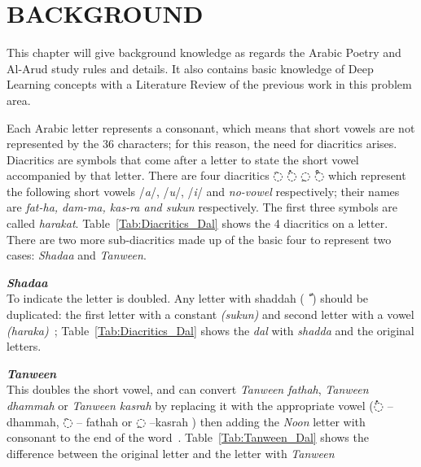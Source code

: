 \chapter{\uppercase{Background}}\label{Ch:Background}
This chapter will give background knowledge as regards the Arabic Poetry and Al-Arud study rules and details. It also contains basic knowledge of Deep Learning concepts with a Literature Review of the previous work in this problem area. 

Each Arabic letter represents a consonant, which means that short vowels are not represented by the 36 characters; for this
reason, the need for diacritics arises. Diacritics are symbols that come after a letter to state the short vowel accompanied by that letter. There are four diacritics \textarabic{◌َ} \textarabic{◌ُ}
\textarabic{◌ِ} \textarabic{◌ْ} which represent the following short vowels /\textit{a}/, /\textit{u}/, /\textit{i}/ and \textit{no-vowel} respectively; their names are \textit{fat-ha, dam-ma, kas-ra and sukun} respectively. The first three symbols are called \textit{harakat}. Table~\ref{Tab:Diacritics_Dal} shows the 4 diacritics on a letter.
There are two more sub-diacritics made up of the basic four to represent two cases: \textit{Shadaa} and \textit{Tanween}.%

\begin{definition}\label{def:shadaa_definition}
  \textbf{\textit{Shadaa}}  \hfill \\
To indicate the letter is doubled. Any letter with shaddah (\textarabic{ ّ }) should be duplicated: the first letter with a constant \textit{(sukun)} and second letter with a vowel \textit{(haraka)}~\cite{Alnagdawi2013}; Table~\ref{Tab:Diacritics_Dal} shows the \textit{dal} with \textit{shadda} and the original letters. %
%
\end{definition}
\begin{definition}\label{def:tanween_definition}
  \textbf{\textit{Tanween}} \hfill \\
  This doubles the short vowel, and can convert \textit{Tanween fathah}, \textit{Tanween dhammah} or \textit{Tanween kasrah} by replacing it with the appropriate vowel (\textarabic{◌ُ} – dhammah, \textarabic{◌َ} – fathah or \textarabic{◌ِ} –kasrah ) then adding the \textit{Noon} letter with consonant to the end of the word~\cite{Alnagdawi2013}. Table~\ref{Tab:Tanween_Dal} shows the difference between the original letter and the letter with \textit{Tanween}
  
\end{definition}%


